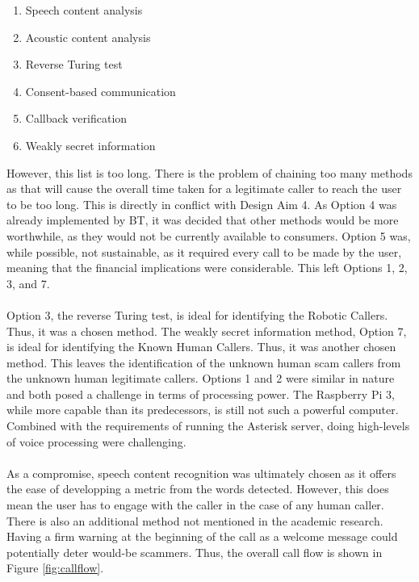 \documentclass[main.tex]{subfiles}
\begin{document}
\begin{enumerate}
	\item Speech content analysis
	\item Acoustic content analysis
	\item Reverse Turing test
	\item Consent-based communication
	\item Callback verification
	\item Weakly secret information
\end{enumerate}

However, this list is too long. There is the problem of chaining too many methods as that will cause the overall time taken for a legitimate caller to reach the user to be too long. This is directly in conflict with Design Aim 4. As Option 4 was already implemented by BT, it was decided that other methods would be more worthwhile, as they would not be currently available to consumers. Option 5 was, while possible, not sustainable, as it required every call to be made by the user, meaning that the financial implications were considerable. This left Options 1, 2, 3, and 7.
\\\\
Option 3, the reverse Turing test, is ideal for identifying the Robotic Callers. Thus, it was a chosen method. The weakly secret information method, Option 7, is ideal for identifying the Known Human Callers. Thus, it was another chosen method. This leaves the identification of the unknown human scam callers from the unknown human legitimate callers. Options 1 and 2 were similar in nature and both posed a challenge in terms of processing power. The Raspberry Pi 3, while more capable than its predecessors, is still not such a powerful computer. Combined with the requirements of running the Asterisk server, doing high-levels of voice processing were challenging.
\\\\
As a compromise, speech content recognition was ultimately chosen as it offers the ease of developping a metric from the words detected. However, this does mean the user has to engage with the caller in the case of any human caller. There is also an additional method not mentioned in the academic research. Having a firm warning at the beginning of the call as a welcome message could potentially deter would-be scammers. Thus, the overall call flow is shown in Figure \ref{fig:callflow}.
\end{document}
